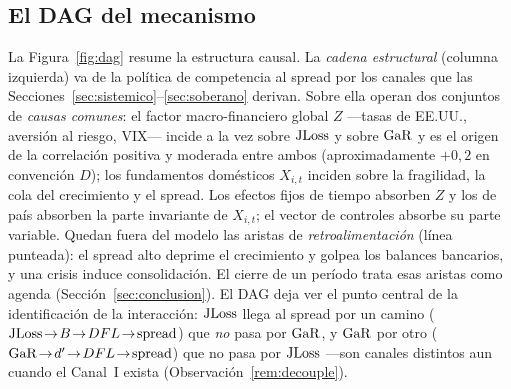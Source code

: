\subsection{El DAG del mecanismo}\label{sec:dag}
La Figura~\ref{fig:dag} resume la estructura causal. La \emph{cadena estructural}
(columna izquierda) va de la política de competencia al spread por los canales que
las Secciones~\ref{sec:sistemico}--\ref{sec:soberano} derivan. Sobre ella operan dos
conjuntos de \emph{causas comunes}: el factor macro-financiero global $Z$ —tasas de
EE.UU., aversión al riesgo, VIX— incide a la vez sobre $\mathrm{JLoss}$ y sobre $\mathrm{GaR}$ y es
el origen de la correlación positiva y moderada entre ambos (aproximadamente $+0{,}2$
en convención $D$); los fundamentos domésticos $X_{i,t}$ inciden sobre la fragilidad,
la cola del crecimiento y el spread. Los efectos fijos de tiempo absorben $Z$ y los
de país absorben la parte invariante de $X_{i,t}$; el vector de controles absorbe su
parte variable. Quedan fuera del modelo las aristas de \emph{retroalimentación}
(línea punteada): el spread alto deprime el crecimiento y golpea los balances
bancarios, y una crisis induce consolidación. El cierre de un período trata esas
aristas como agenda (Sección~\ref{sec:conclusion}). El DAG deja ver el punto central
de la identificación de la interacción: $\mathrm{JLoss}$ llega al spread por un camino
($\mathrm{JLoss}\!\to\!B\!\to\!DFL\!\to\!\mathrm{spread}$) que \emph{no} pasa por $\mathrm{GaR}$, y $\mathrm{GaR}$ por
otro ($\mathrm{GaR}\!\to\!d'\!\to\!DFL\!\to\!\mathrm{spread}$) que no pasa por $\mathrm{JLoss}$ —son canales
distintos aun cuando el Canal~I exista (Observación~\ref{rem:decouple}).

